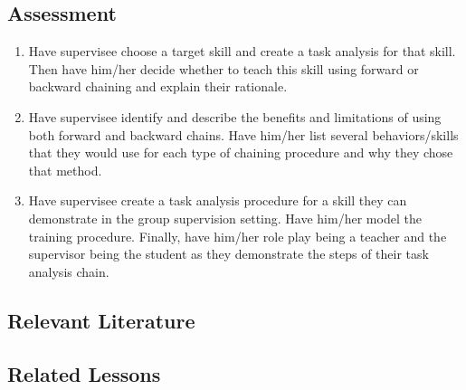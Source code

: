 \subsection{Assessment}
\begin{enumerate}
\item Have supervisee choose a target skill and create a task analysis for that skill. Then have him/her decide whether to teach this skill using forward or backward chaining and explain their rationale.
\item Have supervisee identify and describe the benefits and limitations of using both forward and backward chains. Have him/her list several behaviors/skills that they would use for each type of chaining procedure and why they chose that method.
\item Have supervisee create a task analysis procedure for a skill they can demonstrate in the group supervision setting. Have him/her model the training procedure. Finally, have him/her role play being a teacher and the supervisor being the student as they demonstrate the steps of their task analysis chain.
\end{enumerate}
%
\subsection{Relevant Literature}
\begin{refsection}
\nocite{cooper2007applied,
    catania1998learning,
    libby2008comparison,
    kayser1986comparison,
    spooner1984comparisons,
    reynolds1975primer,
    mcwilliams1990teaching,
    test1990teaching,
    snell2006instruction}
\printbibliography[heading=none]
\end{refsection}
%
\subsection{Related Lessons}
\fouraSeven{}\\
\fourdThree{}\\
\fourdFour{}\\
\fourdFive{}\\
\foureOne{}\\
\foureTwo{}\\
\fouriOne{}\\
\fourjThree{}\\
\fourFKTen{}\\
